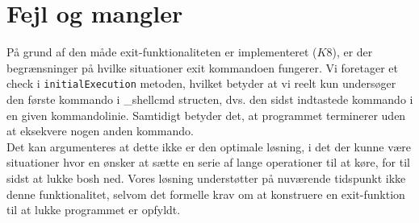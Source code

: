 \documentclass{article}
\begin{document}
\section{Fejl og mangler}
\label{sec:fm}
På grund af den måde exit-funktionaliteten er implementeret ($K8$), er der begrænsninger på hvilke situationer exit kommandoen fungerer. Vi foretager et check i \texttt{initialExecution} metoden, hvilket betyder at vi reelt kun undersøger den første kommando i \_shellcmd structen, dvs. den sidst indtastede kommando i en given kommandolinie. Samtidigt betyder det, at programmet terminerer uden at eksekvere nogen anden kommando.\\

Det kan argumenteres at dette ikke er den optimale løsning, i det der kunne være situationer hvor en ønsker at sætte en serie af lange operationer til at køre, for til sidst at lukke bosh ned. Vores løsning understøtter på nuværende tidspunkt ikke denne funktionalitet, selvom det formelle krav om at konstruere en exit-funktion til at lukke programmet er opfyldt.
\end{document}
